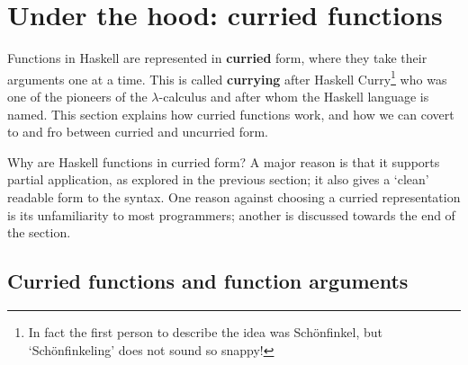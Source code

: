 \section{Under the hood: curried functions}

Functions in Haskell are represented in \textbf{curried} form, where they take their arguments one at a time.
This
is called {\bf currying} after Haskell Curry\footnote{In fact the first
person to describe the idea was Sch\"{o}nfinkel, but `Sch\"{o}nfinkeling' does
not sound so snappy!} who was one of the pioneers of 
the $\lambda$-calculus and after whom the Haskell language is named. This section explains how curried functions work, and how we can covert to and fro between curried and uncurried form.

Why are Haskell functions in curried form? A major reason is that it supports partial application, as explored in the previous section; it also gives a `clean' readable form to the syntax. One reason against choosing a curried representation is its unfamiliarity to most programmers; another is discussed towards the end of the section.


\subsection*{Curried functions and function arguments}

